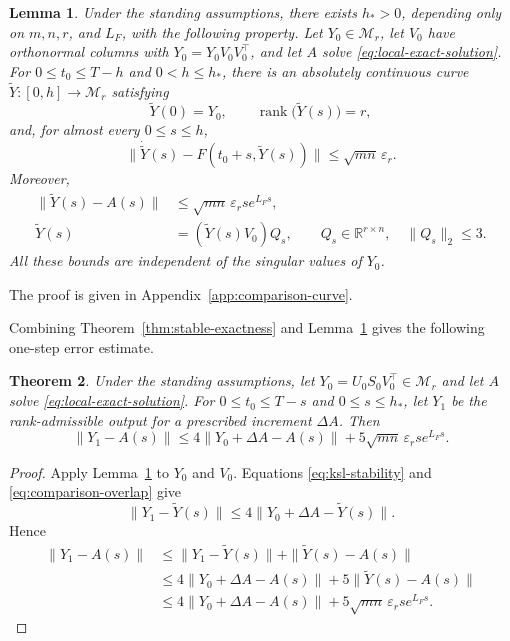 \documentclass[]{article}
\numberwithin{equation}{section}
\theoremstyle{plain}
\newtheorem{theorem}{Theorem}[section]
\newtheorem{lemma}[theorem]{Lemma}
\theoremstyle{remark}
\numberwithin{algorithm}{section}
\newcommand{\R}{\mathbb{R}}
\newcommand{\Mr}{\mathcal{M}_r}
\newcommand{\eps}{\varepsilon}
\newcommand{\rank}{\operatorname{rank}}
\begin{document}
\begin{lemma}
\label{lem:comparison-curve}
Under the standing assumptions, there
exists \(h_*>0\), depending only on \(m,n,r\), and \(L_F\), with the following
property.  Let \(Y_0\in\Mr\), let \(V_0\) have orthonormal columns with
\(Y_0=Y_0V_0V_0^\top\), and let \(A\) solve
\eqref{eq:local-exact-solution}.  For \(0\le t_0\le T-h\) and
\(0<h\le h_*\), there is an
absolutely continuous curve \(\widetilde Y:[0,h]\to\Mr\) satisfying
\begin{equation}\label{eq:comparison-rank}
 \widetilde Y(0)=Y_0,
 \qquad \rank\bigl(\widetilde Y(s)\bigr)=r,
\end{equation}
and, for almost every \(0\le s\le h\),
\begin{equation}\label{eq:comparison-residual}
 \|\dot{\widetilde Y}(s)-F(t_0+s,\widetilde Y(s))\|
 \le\sqrt{mn}\,\eps_r.
\end{equation}
Moreover,
\begin{align}
 \|\widetilde Y(s)-A(s)\|
 &\le\sqrt{mn}\,\eps_r s e^{L_Fs},                    \label{eq:comparison-flow}\\
 \widetilde Y(s)&=(\widetilde Y(s)V_0)Q_s,
 \qquad Q_s\in\R^{r\times n},\quad \|Q_s\|_2\le3.   \label{eq:comparison-overlap}
\end{align}
All these bounds are independent of the singular values of \(Y_0\).
\end{lemma}

The proof is given in Appendix~\ref{app:comparison-curve}.

Combining Theorem~\ref{thm:stable-exactness} and
Lemma~\ref{lem:comparison-curve}
gives the following one-step error estimate.

\begin{theorem}
\label{thm:accuracy-transfer}
Under the standing assumptions, let
\(Y_0=U_0S_0V_0^\top\in\Mr\) and let \(A\) solve
\eqref{eq:local-exact-solution}.  For \(0\le t_0\le T-s\) and
\(0\le s\le h_*\), let \(Y_1\) be the rank-admissible output for a
prescribed increment \(\Delta A\).  Then
\begin{equation}\label{eq:accuracy-transfer}
 \|Y_1-A(s)\|
 \le4\|Y_0+\Delta A-A(s)\|
   +5\sqrt{mn}\,\eps_r s e^{L_Fs}.
\end{equation}
\end{theorem}

\begin{proof}
Apply Lemma~\ref{lem:comparison-curve} to \(Y_0\) and \(V_0\).
Equations \eqref{eq:ksl-stability} and
\eqref{eq:comparison-overlap} give
\[
 \|Y_1-\widetilde Y(s)\|
 \le4\|Y_0+\Delta A-\widetilde Y(s)\|.
\]
Hence
\begin{align*}
 \|Y_1-A(s)\|
 &\le\|Y_1-\widetilde Y(s)\|+\|\widetilde Y(s)-A(s)\|\\
 &\le4\|Y_0+\Delta A-A(s)\|+5\|\widetilde Y(s)-A(s)\|\\
 &\le4\|Y_0+\Delta A-A(s)\|+5\sqrt{mn}\,\eps_r s e^{L_Fs}.
\end{align*}
\end{proof}
\end{document}
